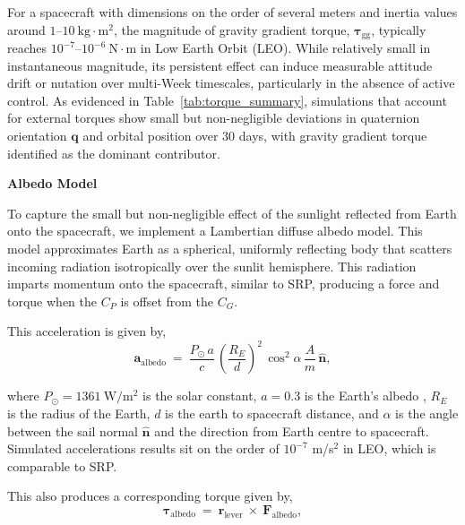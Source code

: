 \documentclass[final,3p,times,twocolumn]{elsarticle}
\begin{document}
\vspace{5pt}
\par\noindent For a spacecraft with dimensions on the order of several meters and inertia values around \(1\text{–}10~\text{kg}\cdot\text{m}^2\), the magnitude of gravity gradient torque, \(\boldsymbol{\tau}_{\text{gg}}\), typically reaches \(10^{-7}\text{–}10^{-6}~\text{N}\cdot\text{m}\) in Low Earth Orbit (LEO). While relatively small in instantaneous magnitude, its persistent effect can induce measurable attitude drift or nutation over multi-Week timescales, particularly in the absence of active control. As evidenced in Table~\ref{tab:torque_summary}, simulations that account for external torques show small but non-negligible deviations in quaternion orientation \( \mathbf{q} \) and orbital position over 30 days, with gravity gradient torque identified as the dominant contributor.\vspace{5pt}


\noindent\textbf{Albedo Model} \vspace{2pt}

\par\noindent To capture the small but non-negligible effect of the sunlight reflected from Earth onto the spacecraft, we implement a Lambertian diffuse albedo model. This model approximates Earth as a spherical, uniformly reflecting body that scatters incoming radiation isotropically over the sunlit hemisphere. This radiation imparts momentum onto the spacecraft, similar to SRP, producing a force and torque when the \( C_P \) is offset from the \( C_G \). 
\vspace{5pt}
\par\noindent This acceleration is given by,
\begin{equation}
    \mathbf{a}_{\text{albedo}} \: = \: \frac{P_{\odot}\,a}{c}\,\left(\frac{R_E}{d}\right)^2\,\cos^2{\alpha}\,\frac{A}{m}\,\hat{\mathbf{n}},
\end{equation}

\noindent where \( P_{\odot} = 1361~\text{W}/\text{m}^2 \) is the solar constant, \( a = 0.3 \) is the Earth's albedo \citep{albedo}, \( R_E \) is the radius of the Earth, \( d \) is the earth to spacecraft distance, and \( \alpha \) is the angle between the sail normal \( \hat{\mathbf{n}} \) and the direction from Earth centre to spacecraft. Simulated accelerations results sit on the order of \( 10^{-7} \) m/s\(^2\) in LEO, which is comparable to SRP.

\vspace{5pt}
\par\noindent This also produces a corresponding torque given by,
\begin{equation}
    \boldsymbol{\tau}_{\text{albedo}} \: = \: \mathbf{r}_{\text{lever}} \: \times \: \mathbf{F}_{\text{albedo}},
\end{equation}
\end{document}
